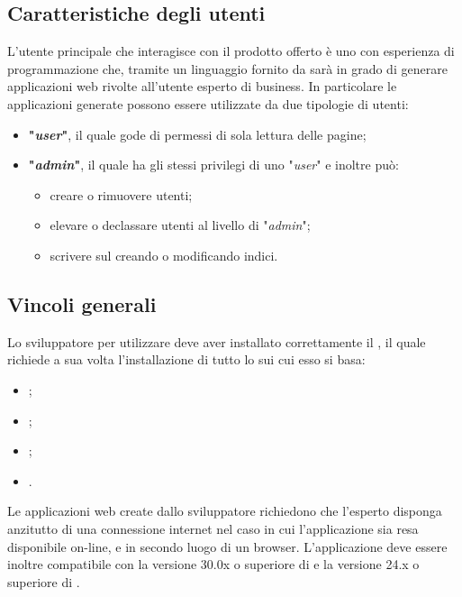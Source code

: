 	\subsection{Caratteristiche degli utenti}
	L'utente principale che interagisce con il prodotto offerto è uno  con esperienza di programmazione che, tramite un linguaggio  fornito da \ProjectName{} sarà in grado di generare applicazioni web rivolte all'utente esperto di business. In particolare le applicazioni generate possono essere utilizzate da due tipologie di utenti:
	\begin{itemize}
		\item \textbf{"\textit{user}"}, il quale gode di permessi di sola lettura delle pagine;
		\item \textbf{"\textit{admin}"}, il quale ha gli stessi privilegi di uno "\textit{user}" e inoltre può:
		\begin{itemize}
			\item creare o rimuovere utenti;
			\item elevare o declassare utenti al livello di "\textit{admin}";
			\item scrivere sul  creando o modificando indici.
		\end{itemize}		 	
	\end{itemize}
	
	\subsection{Vincoli generali}
	Lo sviluppatore per utilizzare \ProjectName{} deve aver installato correttamente il , il quale richiede a sua volta l'installazione di tutto lo  sui cui esso si basa:
	\begin{itemize}
		\item \textbf{};
		\item \textbf{};
		\item \textbf{};
		\item \textbf{}.
	\end{itemize}
	Le applicazioni web create dallo sviluppatore richiedono che l'esperto  disponga anzitutto di una connessione internet nel caso in cui l'applicazione sia resa disponibile on-line, e in secondo luogo di un browser. L'applicazione deve essere inoltre compatibile con la versione 30.0x o superiore di  e la versione 24.x o superiore di .